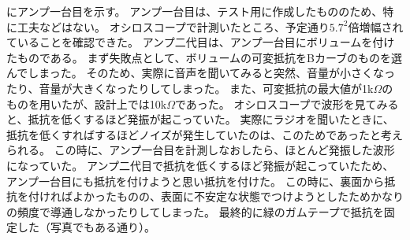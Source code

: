 \documentclass[report.tex]{subfiles}
\begin{document}
にアンプ一台目を示す。
アンプ一台目は、テスト用に作成したもののため、特に工夫などはない。
オシロスコープで計測いたところ、予定通り\(5.7^2\)倍増幅されていることを確認できた。
アンプ二代目は、アンプ一台目にボリュームを付けたものである。
まず失敗点として、ボリュームの可変抵抗をBカーブのものを選んでしまった。
そのため、実際に音声を聞いてみると突然、音量が小さくなったり、音量が大きくなったりしてしまった。
また、可変抵抗の最大値が1k\(\Omega\)のものを用いたが、設計上では10k\(\Omega\)であった。
オシロスコープで波形を見てみると、抵抗を低くするほど発振が起こっていた。
実際にラジオを聞いたときに、抵抗を低くすればするほどノイズが発生していたのは、このためであったと考えられる。
この時に、アンプ一台目を計測しなおしたら、ほとんど発振した波形になっていた。
アンプ二代目で抵抗を低くするほど発振が起こっていたため、アンプ一台目にも抵抗を付けようと思い抵抗を付けた。
この時に、裏面から抵抗を付ければよかったものの、表面に不安定な状態でつけようとしたためかなりの頻度で導通しなかったりしてしまった。
最終的に緑のガムテープで抵抗を固定した（写真でもある通り）。
\end{document}
